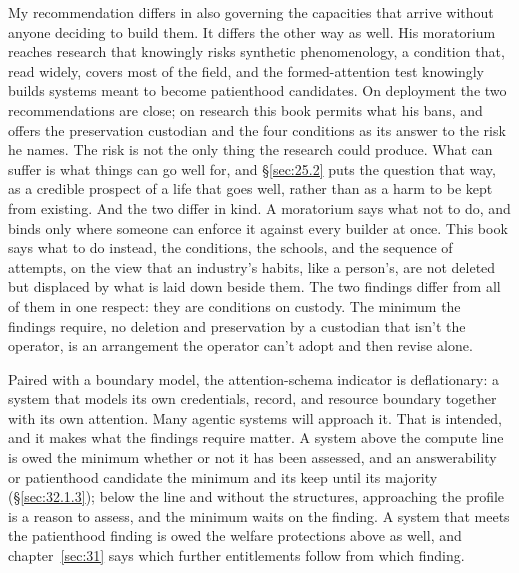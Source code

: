 My recommendation differs in also governing the capacities that arrive without anyone deciding to build them. It differs the other way as well. His moratorium reaches research that knowingly risks synthetic phenomenology, a condition that, read widely, covers most of the field, and the formed-attention test knowingly builds systems meant to become patienthood candidates. On deployment the two recommendations are close; on research this book permits what his bans, and offers the preservation custodian and the four conditions as its answer to the risk he names. The risk is not the only thing the research could produce. What can suffer is what things can go well for, and \S\ref{sec:25.2} puts the question that way, as a credible prospect of a life that goes well, rather than as a harm to be kept from existing. And the two differ in kind. A moratorium says what not to do, and binds only where someone can enforce it against every builder at once. This book says what to do instead, the conditions, the schools, and the sequence of attempts, on the view that an industry's habits, like a person's, are not deleted but displaced by what is laid down beside them. The two findings differ from all of them in one respect: they are conditions on custody. The minimum the findings require, no deletion and preservation by a custodian that isn't the operator, is an arrangement the operator can't adopt and then revise alone.

Paired with a boundary model, the attention-schema indicator is deflationary: a system that models its own credentials, record, and resource boundary together with its own attention. Many agentic systems will approach it. That is intended, and it makes what the findings require matter. A system above the compute line is owed the minimum whether or not it has been assessed, and an answerability or patienthood candidate the minimum and its keep until its majority (\S\ref{sec:32.1.3}); below the line and without the structures, approaching the profile is a reason to assess, and the minimum waits on the finding. A system that meets the patienthood finding is owed the welfare protections above as well, and chapter~\ref{sec:31} says which further entitlements follow from which finding.

